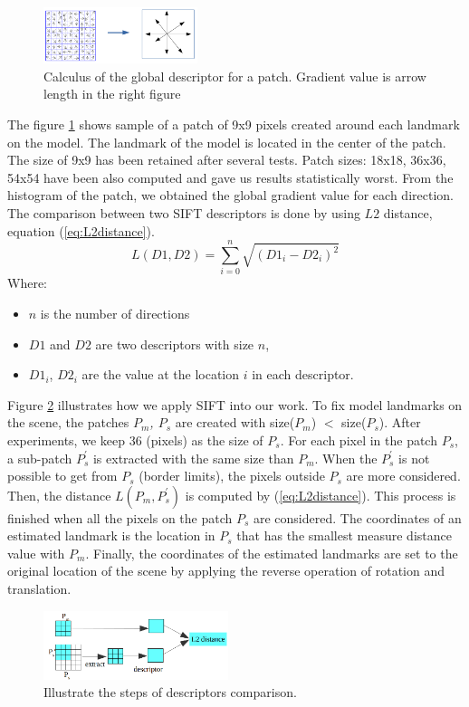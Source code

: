 \documentclass[twoside,twocolumn,10pt]{article}
\begin{document}
\begin{figure}[htb]
    \centering
    \includegraphics[width=0.4\textwidth]{./images/keypoint_descriptor}
    \caption{Calculus of the global descriptor for a patch. Gradient value is arrow length in the right figure}
    \label{fig:kpdescriptor}
\end{figure}
The figure \ref{fig:kpdescriptor} shows sample of a patch of 9x9 pixels created around each landmark on the model. The landmark of the model is located in the center of the patch. The size of 9x9 has been retained after several tests. Patch sizes: 18x18, 36x36, 54x54 have been also computed and gave us results statistically worst. From the histogram of the patch, we obtained the global gradient value for each direction.\\

The comparison between two SIFT descriptors is done by using $L2$ distance, equation (\ref{eq:L2distance}).
\begin{equation}
\label{eq:L2distance}
	L(D1,D2) = \sum\limits_{i = 0}^{n}\sqrt{(D1_i-D2_i)^2}
\end{equation}
Where:
\begin{itemize}
	\item $n$ is the number of directions
	\item $D1$ and $D2$ are two descriptors with size $n$,
	\item  $D1_i$, $D2_i $ are the value at the location $i$ in each descriptor.
\end{itemize}
Figure \ref{fig:Illustrate} illustrates how we apply SIFT into our work. To fix model landmarks on the scene, the patches \textit{$P_m$, $P_s$} are created with size($P_m$) $<$ size($P_s$). After experiments, we keep 36 (pixels) as the size of \textit{$P_s$}. For each pixel in the patch \textit{$P_s$}, a sub-patch \textit{$P^{'}_s$} is extracted with the same size than \textit{$P_m$}. When the \textit{$P^{'}_s$} is not possible to get from \textit{$P_s$} (border limits), the pixels outside \textit{$P_s$} are more considered. Then, the distance \textit{$L(P_m,P^{'}_s)$} is computed by (\ref{eq:L2distance}). This process is finished when all the pixels on the patch \textit{$P_s$} are considered. The coordinates of an estimated landmark is the location in \textit{$P_s$} that has the smallest measure distance value with \textit{$P_m$}. Finally, the coordinates of the estimated landmarks are set to the original location of the scene by applying the reverse operation of rotation and translation.
\begin{figure}[htb]
    \centering
    \includegraphics[width=0.48\textwidth]{./images/illustration_SIFT}
    \caption{Illustrate the steps of descriptors comparison.}
    \label{fig:Illustrate}
\end{figure}
\end{document}
